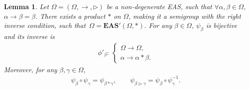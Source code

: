 \documentclass[pdftex]{sigma}
\numberwithin{equation}{section}
\newtheorem{Lemma}[Theorem]{Lemma}
\newcommand{\eas}{\mathbf{EAS}}
\begin{document}
\begin{Lemma}\label{lem3.5}
Let $\Omega=(\Omega,\rightarrow,\triangleright)$ be a non-degenerate EAS, such that
$\forall \alpha,\beta \in \Omega$, $\alpha \rightarrow \beta =\beta$.
There exists a product $*$ on $\Omega$, making it a semigroup with the right inverse condition, such that~${\Omega=\eas'(\Omega,*)}$. For any $\beta\in \Omega$, $\psi_\beta$ is bijective and its inverse is
\begin{align*}
\phi'_\beta\colon\ \begin{cases}
\Omega \longrightarrow \Omega,\\
\alpha \longrightarrow \alpha*\beta.
\end{cases}
\end{align*}
Moreover, for any $\beta,\gamma \in \Omega$,
\begin{align}
\label{eq26}
\psi_\beta \circ \psi_\gamma =\psi_{\beta*\gamma},\qquad \psi_{\beta \triangleright \gamma} =\psi_\beta \circ \psi_\gamma^{-1}.
\end{align}\end{Lemma}
\end{document}
